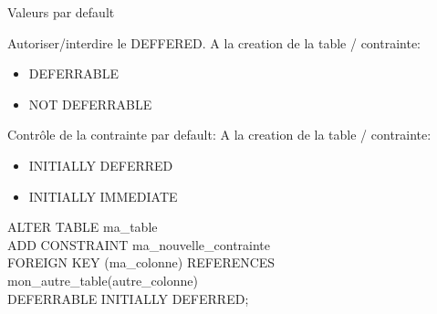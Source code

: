 \documentclass[dvipsnames]{beamer}
\begin{document}
\begin{frame}{Valeurs par default}
	\begin{block}{Autoriser/interdire le DEFFERED.}
	A la creation de la table / contrainte:
		\begin{itemize}
			\item DEFERRABLE
			\item NOT DEFERRABLE
		\end{itemize}
	\end{block}
	
	\begin{block}{Contrôle de la contrainte par default:}
	A la creation de la table / contrainte:
		\begin{itemize}
			\item INITIALLY DEFERRED
			\item INITIALLY IMMEDIATE
		\end{itemize}
	\end{block}

	\begin{alertblock}{}
{\scriptsize ALTER TABLE ma\_table\\ ADD CONSTRAINT ma\_nouvelle\_contrainte\\ FOREIGN KEY (ma\_colonne) REFERENCES mon\_autre\_table(autre\_colonne)\\ DEFERRABLE INITIALLY DEFERRED;}
	\end{alertblock}

\end{frame}
\end{document}
